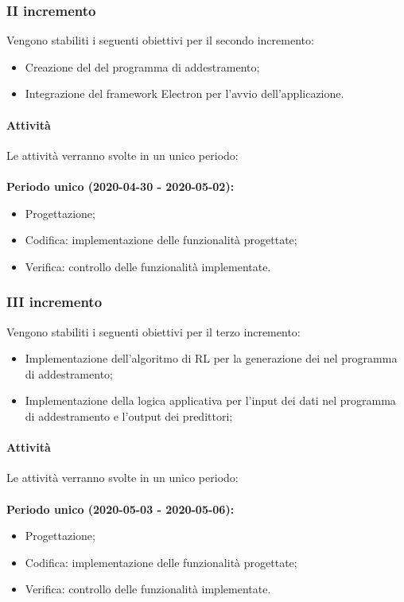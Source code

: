 \documentclass[../piano-di-progetto.tex]{subfiles}
\begin{document}
\subsubsection{II incremento}
 
 
 Vengono stabiliti i seguenti obiettivi per il secondo incremento:
 \begin{itemize}
     \item Creazione del  del programma di addestramento;
     \item Integrazione del framework Electron per l'avvio dell'applicazione.
 \end{itemize}
\paragraph{Attività}
Le attività verranno svolte in un unico periodo:
\\
\\
\textbf{Periodo unico (2020-04-30 - 2020-05-02):}
\begin{itemize}
    \item Progettazione;
    \item Codifica: implementazione delle funzionalità progettate;
    \item Verifica: controllo delle funzionalità implementate.
\end{itemize}


\subsubsection{III incremento}

 Vengono stabiliti i seguenti obiettivi per il terzo incremento:
 \begin{itemize}
     \item Implementazione dell'algoritmo di RL per la generazione dei  nel programma di addestramento;
     
     \item Implementazione della logica applicativa per l'input dei dati nel programma di addestramento e l'output dei predittori;
 \end{itemize}
 
\paragraph{Attività}
Le attività verranno svolte in un unico periodo:
\\
\\
\textbf{Periodo unico (2020-05-03 - 2020-05-06):}
\begin{itemize}
    \item Progettazione;
    \item Codifica: implementazione delle funzionalità progettate;
    \item Verifica: controllo delle funzionalità implementate.
\end{itemize}
\end{document}
